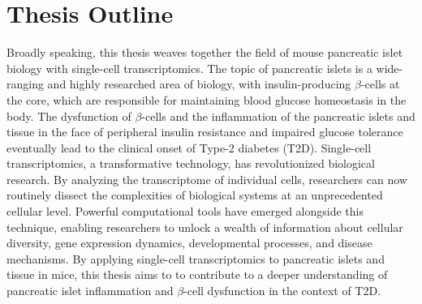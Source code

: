 
\chapter{Thesis Outline}
\label{chp:outline}

Broadly speaking, this thesis weaves together the field of mouse pancreatic islet biology with single-cell transcriptomics. The topic of pancreatic islets is a wide-ranging and highly researched area of biology, with insulin-producing $\beta$-cells at the core, which are responsible for maintaining blood glucose homeostasis in the body. The dysfunction of $\beta$-cells and the inflammation of the pancreatic islets and tissue in the face of peripheral insulin resistance and impaired glucose tolerance eventually lead to the clinical onset of Type-2 diabetes (T2D). Single-cell transcriptomics, a transformative technology, has revolutionized biological research. By analyzing the transcriptome of individual cells, researchers can now routinely dissect the complexities of biological systems at an unprecedented cellular level. Powerful computational tools have emerged alongside this technique, enabling researchers to unlock a wealth of information about cellular diversity, gene expression dynamics, developmental processes, and disease mechanisms. By applying single-cell transcriptomics to pancreatic islets and tissue in mice, this thesis aims to to contribute to a deeper understanding of pancreatic islet inflammation and $\beta$-cell dysfunction in the context of T2D.\\


